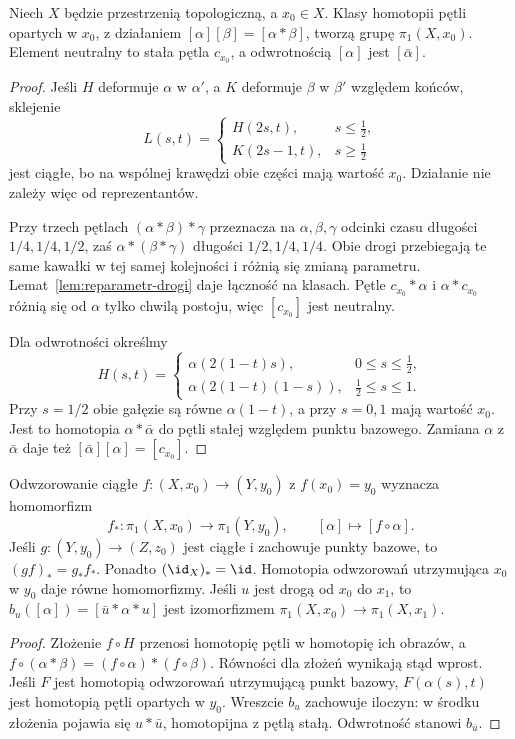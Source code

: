 \begin{twierdzenie}
\label{thm:grupa-podstawowa}
Niech $X$ będzie przestrzenią topologiczną,
a $x_0\in X$.
Klasy homotopii pętli opartych w $x_0$,
z działaniem $[\alpha][\beta]=[\alpha*\beta]$,
tworzą grupę $\pi_1(X,x_0)$.
Element neutralny to stała pętla $c_{x_0}$,
a odwrotnością $[\alpha]$ jest $[\bar\alpha]$.
\end{twierdzenie}
\begin{proof}
Jeśli $H$ deformuje $\alpha$ w $\alpha'$,
a $K$ deformuje $\beta$ w $\beta'$
względem końców, sklejenie
\[
 L(s,t)=
 \begin{cases}
   H(2s,t),&s\leq\tfrac12,\\
   K(2s-1,t),&s\geq\tfrac12
 \end{cases}
\]
jest ciągłe, bo na wspólnej krawędzi
obie części mają wartość $x_0$.
Działanie nie zależy więc od reprezentantów.

Przy trzech pętlach $(\alpha*\beta)*\gamma$
przeznacza na $\alpha,\beta,\gamma$
odcinki czasu długości $1/4,1/4,1/2$,
zaś $\alpha*(\beta*\gamma)$ długości
$1/2,1/4,1/4$. Obie drogi przebiegają
te same kawałki w tej samej kolejności
i różnią się zmianą parametru.
Lemat~\ref{lem:reparametr-drogi} daje łączność
na klasach. Pętle $c_{x_0}*\alpha$
i $\alpha*c_{x_0}$ różnią się od $\alpha$
tylko chwilą postoju, więc
$[c_{x_0}]$ jest neutralny.

Dla odwrotności określmy
\[
 H(s,t)=
 \begin{cases}
  \alpha(2(1-t)s),&0\leq s\leq\tfrac12,\\
  \alpha(2(1-t)(1-s)),&\tfrac12\leq s\leq1.
 \end{cases}
\]
Przy $s=1/2$ obie gałęzie są równe
$\alpha(1-t)$, a przy $s=0,1$ mają
wartość $x_0$. Jest to homotopia
$\alpha*\bar\alpha$ do pętli stałej
względem punktu bazowego. Zamiana
$\alpha$ z $\bar\alpha$ daje też
$[\bar\alpha][\alpha]=[c_{x_0}]$.
\end{proof}

\begin{stwierdzenie}
\label{prop:pi1-funktor}
Odwzorowanie ciągłe $f:(X,x_0)\to(Y,y_0)$
z $f(x_0)=y_0$ wyznacza homomorfizm
\[
 f_*:\pi_1(X,x_0)\to\pi_1(Y,y_0),
 \qquad [\alpha]\mapsto[f\circ\alpha].
\]
Jeśli $g:(Y,y_0)\to(Z,z_0)$ jest ciągłe
i zachowuje punkty bazowe, to $(gf)_*=g_*f_*$.
Ponadto $(\id_X)_*=\id$.
Homotopia odwzorowań
utrzymująca $x_0$ w $y_0$ daje
równe homomorfizmy. Jeśli
$u$ jest drogą od $x_0$ do $x_1$,
to $b_u([\alpha])=[\bar u*\alpha*u]$
jest izomorfizmem
$\pi_1(X,x_0)\to\pi_1(X,x_1)$.
\end{stwierdzenie}
\begin{proof}
Złożenie $f\circ H$ przenosi homotopię
pętli w homotopię ich obrazów, a
$f\circ(\alpha*\beta)
=(f\circ\alpha)*(f\circ\beta)$.
Równości dla złożeń wynikają stąd wprost.
Jeśli $F$ jest homotopią odwzorowań utrzymującą
punkt bazowy, $F(\alpha(s),t)$ jest
homotopią pętli opartych w $y_0$.
Wreszcie $b_u$ zachowuje iloczyn:
w środku złożenia pojawia się
$u*\bar u$, homotopijna z pętlą stałą.
Odwrotność stanowi $b_{\bar u}$.
\end{proof}

